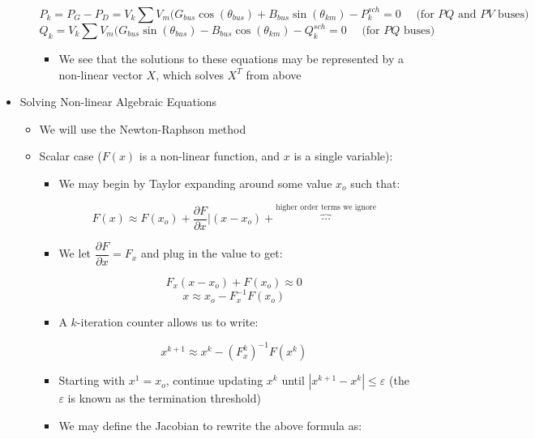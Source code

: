 \begin{itemize}
\begin{itemize}
        $$P_k=P_{G}-P_D=V_k\sum V_m(G_{bus}\cos(\theta_{bus})+B_{bus}\sin(\theta_{km})-P_k^{sch}=0\quad\text{ (for $PQ$ and $PV$ buses)}$$
          $$Q_k=V_k\sum V_m(G_{bus}\sin(\theta_{bus})-B_{bus}\cos(\theta_{km})-Q_k^{sch}=0\quad\text{ (for $PQ$ buses)}$$

            \begin{itemize}

              \item We see that the solutions to these equations may be represented by a non-linear vector $X$, which solves $X^T$ from above

            \end{itemize}

    \end{itemize}

  \item Solving Non-linear Algebraic Equations

    \begin{itemize}

      \item We will use the Newton-Raphson method

      \item Scalar case ($F(x)$ is a non-linear function, and $x$ is a single variable):

        \begin{itemize}

          \item We may begin by Taylor expanding around some value $x_o$ such that:

            $$F(x)\approx F(x_o)+\dfrac{\partial F}{\partial x}\Big| (x-x_o)+\overbrace{\cdots}^{\text{higher order terms we ignore}}$$

          \item We let $\dfrac{\partial F}{\partial x}=F_x$ and plug in the value to get:

            $$F_x(x-x_o)+F(x_o)\approx 0$$
            $$x\approx x_o-F_x^{-1}F(x_o)$$

          \item A $k$-iteration counter allows us to write:

            $$x^{k+1}\approx x^k-(F_x^k)^{-1}F(x^k)$$

          \item Starting with $x^1=x_o$, continue updating $x^k$ until $|x^{k+1}-x^k|\leq \varepsilon$ (the $\varepsilon$ is known as the termination threshold)

          \item We may define the Jacobian to rewrite the above formula as:


\end{itemize}
\end{itemize}
\end{itemize}
